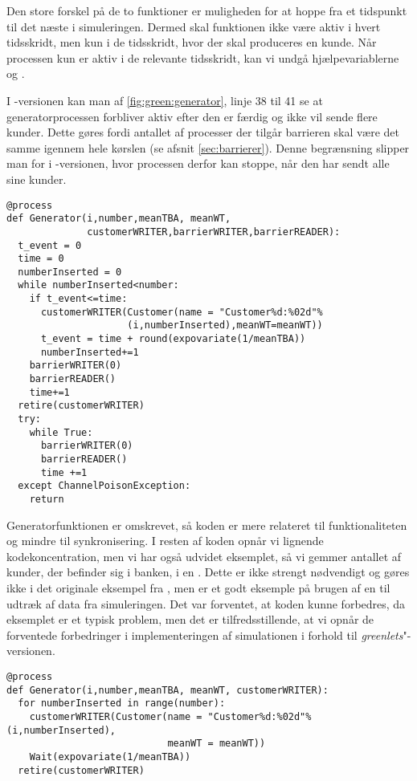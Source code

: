 Den store forskel på de to funktioner er muligheden for at hoppe fra et tidspunkt til det næste i simuleringen. Dermed skal funktionen ikke være aktiv i hvert tidsskridt, men kun i de tidsskridt, hvor der skal produceres en kunde. Når processen kun er aktiv i de relevante tidsskridt, kan vi undgå hjælpevariablerne  og . 

I  -versionen kan man af \cref{fig:green:generator}, linje 38 til 41 se at generatorprocessen forbliver aktiv efter den er færdig og ikke vil sende flere kunder. Dette gøres fordi antallet af processer der tilgår barrieren skal være det samme igennem hele kørslen (se afsnit \cref{sec:barrierer}).  Denne begrænsning slipper man for i -versionen, hvor processen derfor kan stoppe, når den har sendt alle sine kunder.

\begin{lstlisting}[firstnumber=21, label=fig:green:generator, caption=Generatorprocessen for \emph{greenlets}-versionen]
@process
def Generator(i,number,meanTBA, meanWT,
              customerWRITER,barrierWRITER,barrierREADER):
  t_event = 0
  time = 0
  numberInserted = 0
  while numberInserted<number:
    if t_event<=time:
      customerWRITER(Customer(name = "Customer%d:%02d"%
                     (i,numberInserted),meanWT=meanWT))
      t_event = time + round(expovariate(1/meanTBA))
      numberInserted+=1
    barrierWRITER(0)
    barrierREADER()
    time+=1
  retire(customerWRITER)
  try:
    while True:
      barrierWRITER(0)
      barrierREADER()
      time +=1
  except ChannelPoisonException: 
    return
\end{lstlisting}

Generatorfunktionen er omskrevet, så koden er mere relateret til funktionaliteten og mindre til synkronisering.  I resten af koden opnår vi lignende kodekoncentration, men vi har også udvidet eksemplet, så vi gemmer antallet af kunder, der befinder sig i banken, i en . Dette er ikke strengt nødvendigt og gøres ikke i det originale eksempel fra \simpy, men er et godt eksemple på brugen af en  til udtræk af data fra simuleringen. Det var forventet, at koden kunne forbedres, da eksemplet er et typisk \des problem, men det er tilfredsstillende, at vi opnår de forventede forbedringer i implementeringen af simulationen i forhold til \emph{greenlets}"-versionen.


\begin{lstlisting}[firstnumber=20, label=fig:sim:generator, caption=Generatorprocessen for \emph{simulerings}-versionen]
@process
def Generator(i,number,meanTBA, meanWT, customerWRITER):
  for numberInserted in range(number):
    customerWRITER(Customer(name = "Customer%d:%02d"%(i,numberInserted),
                            meanWT = meanWT))
    Wait(expovariate(1/meanTBA))
  retire(customerWRITER)
\end{lstlisting}

